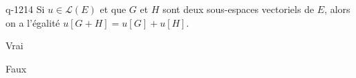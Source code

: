 \begin{truefalse}{q-1214}
Si $u\in \mathcal{L}(E)$ et que $G$ et $H$ sont deux sous-espaces vectoriels de $E$, alors on a l'égalité $u[G+H]=u[G]+u[H]$.
\item* Vrai
\item Faux
\end{truefalse}

